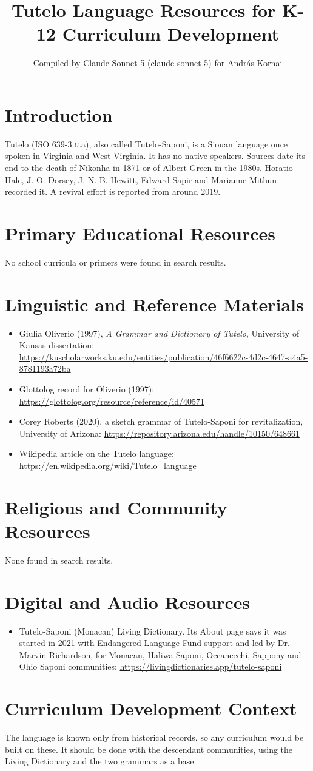 \documentclass[12pt]{article}
\title{Tutelo Language Resources for K-12 Curriculum Development}
\author{Compiled by Claude Sonnet 5 (claude-sonnet-5) for Andr\'as Kornai}
\date{}
\begin{document}
\maketitle

\section{Introduction}
Tutelo (ISO 639-3 tta), also called Tutelo-Saponi, is a Siouan language once spoken in Virginia and West Virginia. It has no native speakers. Sources date its end to the death of Nikonha in 1871 or of Albert Green in the 1980s. Horatio Hale, J. O. Dorsey, J. N. B. Hewitt, Edward Sapir and Marianne Mithun recorded it. A revival effort is reported from around 2019.

\section{Primary Educational Resources}
No school curricula or primers were found in search results.

\section{Linguistic and Reference Materials}
\begin{itemize}
\item Giulia Oliverio (1997), \emph{A Grammar and Dictionary of Tutelo}, University of Kansas dissertation: \url{https://kuscholarworks.ku.edu/entities/publication/46f6622c-4d2c-4647-a4a5-8781193a72ba}
\item Glottolog record for Oliverio (1997): \url{https://glottolog.org/resource/reference/id/40571}
\item Corey Roberts (2020), a sketch grammar of Tutelo-Saponi for revitalization, University of Arizona: \url{https://repository.arizona.edu/handle/10150/648661}
\item Wikipedia article on the Tutelo language: \url{https://en.wikipedia.org/wiki/Tutelo_language}
\end{itemize}

\section{Religious and Community Resources}
None found in search results.

\section{Digital and Audio Resources}
\begin{itemize}
\item Tutelo-Saponi (Monacan) Living Dictionary. Its About page says it was started in 2021 with Endangered Language Fund support and led by Dr. Marvin Richardson, for Monacan, Haliwa-Saponi, Occaneechi, Sappony and Ohio Saponi communities: \url{https://livingdictionaries.app/tutelo-saponi}
\end{itemize}

\section{Curriculum Development Context}
The language is known only from historical records, so any curriculum would be built on these. It should be done with the descendant communities, using the Living Dictionary and the two grammars as a base.
\end{document}

